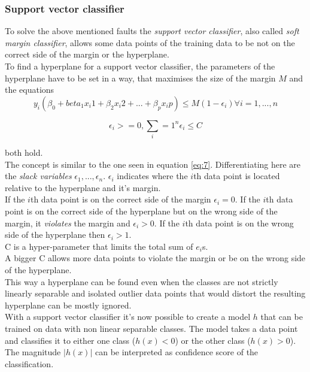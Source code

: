 \subsubsection*{Support vector classifier}

To solve the above mentioned faults the \emph{support vector classifier}, also called \emph{soft margin classifier}, allows some data points of the training data to be not on the correct side of the margin or the hyperplane. 
\\
To find a hyperplane for a support vector classifier, the parameters of the hyperplane have to be set in a way, that maximises the size of the margin $M$ and the equations 
\begin{equation} \label{eq:8}
y_i(\beta_0+beta_1 x_i1 +\beta_2 x_i2 + ... +\beta_p x_ip) \leq M(1- \epsilon_i ) \forall i=1,...,n
\end{equation}

\begin{equation} \label{eq:9}
\epsilon_i >= 0, \sum_i=1^n \epsilon_i \leq	 C
\end{equation}

both hold.\\
The concept is similar to the one seen in equation \ref{eq:7}. Differentiating here are the \emph{slack variables} $\epsilon_1, ..., \epsilon_n$. $\epsilon_i$ indicates where the $i$th data point is located relative to the hyperplane and it's margin.
\\
 If the $i$th data point is on the correct side of the margin $\epsilon_i=0$. If the $i$th data point is on the correct side of the hyperplane but on the wrong side of the margin, it \emph{violates} the margin and $\epsilon_i>0$. If the $i$th data point is on the wrong side of the hyperplane then $\epsilon_i>1$.  \\
C is a hyper-parameter that limits the total sum of $e_i$s.\\
A bigger C allows more data points to violate the margin or be on the wrong side of the hyperplane. \\
This way a hyperplane can be found even when the classes are not strictly linearly separable and isolated outlier data points that would  distort the resulting hyperplane can be mostly ignored.\\


With a support vector classifier it's now possible to create a model $h$ that can be trained on data with non linear separable classes. The model takes a data point and classifies it to either one class ($h(x)<0$) or the other class ($h(x)>0$). The magnitude $|h(x)|$ can be interpreted as confidence score of the classification.\cite{Burges1998} \cite{james2013introduction}


